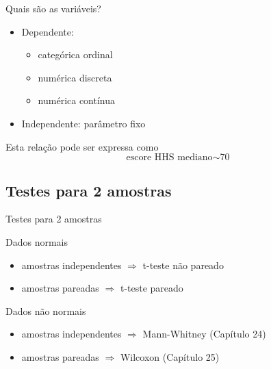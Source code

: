 \documentclass{beamer}
\begin{document}
\begin{frame}{Quais são as variáveis?}
  \begin{itemize}
    \small
  \item Dependente:
    \begin{itemize}
      \footnotesize
    \item categórica ordinal
    \item numérica discreta
    \item numérica contínua
    \end{itemize}
  \item Independente: parâmetro fixo
  \end{itemize}
  \vfill
  \begin{block}{Esta relação pode ser expressa como}
    \begin{displaymath}
      \text{escore HHS mediano} \sim \text{70}
    \end{displaymath}
  \end{block}
\end{frame}

\subsection[2 médias]{Testes para 2 amostras}

\begin{frame}{Testes para 2 amostras}
  \begin{block}{Dados normais}
    \begin{itemize}
    \item amostras independentes $\Rightarrow$ t-teste não pareado
    \item amostras pareadas $\Rightarrow$ t-teste pareado
    \end{itemize}
  \end{block}
  \begin{block}{Dados não normais}
    \begin{itemize}
    \item amostras independentes $\Rightarrow$ \alert{Mann-Whitney} (Capítulo 24)%
    \item amostras pareadas $\Rightarrow$ Wilcoxon (Capítulo 25)
    \end{itemize}
  \end{block}
\end{frame}
\end{document}

